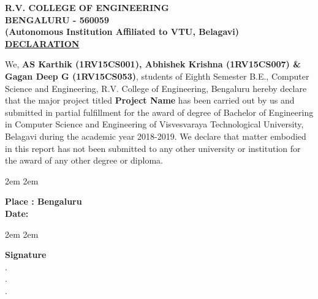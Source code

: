 \newpage


\begin{center}
	\textbf {
		\large R.V. COLLEGE OF ENGINEERING \\
		\large BENGALURU - 560059\\
		\small(Autonomous Institution Affiliated to VTU, Belagavi)\\[1cm]
	}
	\Large \textbf{\underline {DECLARATION}}\\[1cm]
\end{center}
\linespread{1.5}\normalsize \begin{center} \justify
We, \textbf{AS Karthik (1RV15CS001), Abhishek Krishna (1RV15CS007) \& Gagan Deep G (1RV15CS053)}, students of Eighth Semester B.E., Computer Science and
Engineering, R.V. College of Engineering, Bengaluru hereby declare that the major
project titled \textbf{Project Name} has been carried out by us and submitted in partial
fulfillment for the award of degree of Bachelor of Engineering in Computer Science
and Engineering of Visvesvaraya Technological University, Belagavi during the
academic year 2018-2019. We declare that matter embodied in this report has not been submitted to any other university or institution for the award of any other degree or diploma.
\end{center}
\linespread{1}

\begin{multicols}{2}

	\begin{center}
		\begingroup
			\leftskip2em
			\rightskip2em

			\normalsize \textbf{Place : Bengaluru} \\
			\medskip
			\textbf{Date: }\hrulefill\\
		\endgroup
	\end{center}

	\columnbreak

	\begin{center}
		\begingroup
			\leftskip2em
			\rightskip2em

			\textbf{Signature}\\
			. \hrulefill\\
			. \hrulefill\\
			. \hrulefill\\
		\endgroup
	\end{center}


\end{multicols}

